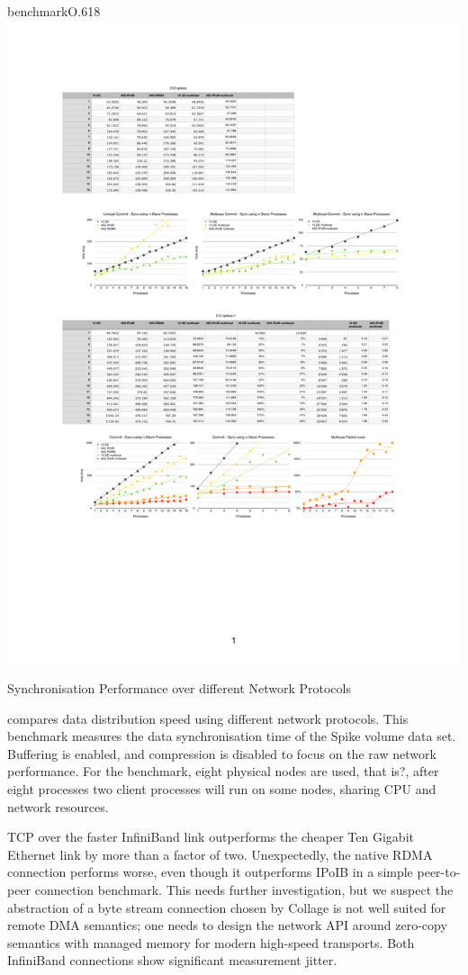 \begin{wrapfloat}{benchmark}{O}{.618\textwidth}
  \includegraphics[width=.618\textwidth]{results/network}
  {\caption{\label{rNetwork}Synchronisation Performance over different Network Protocols}}
\end{wrapfloat}

 compares data distribution speed using different network
protocols. This benchmark measures the data synchronisation time of the Spike volume
data set. Buffering is enabled, and compression is disabled to
focus on the raw network performance. For the benchmark, eight physical nodes
are used, that is?, after eight processes two client processes will run on some
nodes, sharing CPU and network resources.

TCP over the faster InfiniBand link outperforms the cheaper Ten Gigabit
Ethernet link by more than a factor of two. Unexpectedly, the native RDMA
connection performs worse, even though it outperforms IPoIB in a simple
peer-to-peer connection benchmark. This needs further investigation, but we
suspect the abstraction of a byte stream connection chosen by Collage is not
well suited for remote DMA semantics; one needs to design the network
API around zero-copy semantics with managed memory for modern high-speed
transports. Both InfiniBand connections show significant measurement jitter.

